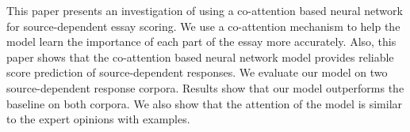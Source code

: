 This paper presents an investigation of using a co-attention based neural network for source-dependent essay scoring. We use a co-attention mechanism to help the model learn the importance of each part of the essay more accurately. Also, this paper shows that the co-attention based neural network model provides reliable score prediction of source-dependent responses. We evaluate our model on two source-dependent response corpora. Results show that our model outperforms the baseline on both corpora. We also show that the attention of the model is similar to the expert opinions with examples.
